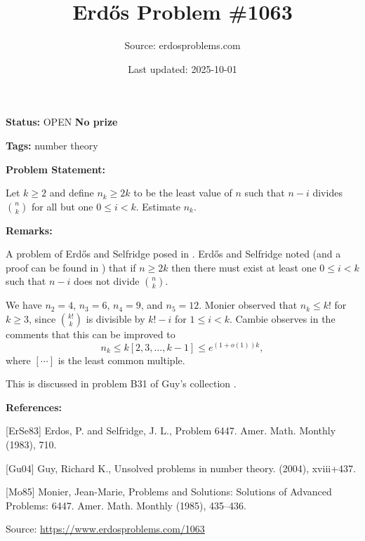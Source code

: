 \documentclass{article}
\title{Erd\H{o}s Problem \#1063}
\date{Last updated: 2025-10-01}
\author{Source: erdosproblems.com}
\begin{document}
\maketitle

\noindent\textbf{Status:} OPEN \quad \textbf{No prize}

\noindent\textbf{Tags:} number theory

\medskip
\noindent\textbf{Problem Statement:}

Let $k\geq 2$ and define $n_k\geq 2k$ to be the least value of $n$ such that $n-i$ divides $\binom{n}{k}$ for all but one $0\leq i<k$. Estimate $n_k$.

\bigskip
\noindent\textbf{Remarks:}

A problem of Erd\H{o}s and Selfridge posed in \cite{ErSe83}. Erd\H{o}s and Selfridge noted (and a proof can be found in \cite{Mo85}) that if $n\geq 2k$ then there must exist at least one $0\leq i<k$ such that $n-i$ does not divide $\binom{n}{k}$. 

We have $n_2=4$, $n_3=6$, $n_4=9$, and $n_5=12$. Monier \cite{Mo85} observed that $n_k\leq k!$ for $k\geq 3$, since $\binom{k!}{k}$ is divisible by $k!-i$ for $1\leq i<k$. Cambie observes in the comments that this can be improved to\[n_k\leq k[2,3,\ldots,k-1]\leq e^{(1+o(1))k},\]where $[\cdots]$ is the least common multiple.

This is discussed in problem B31 of Guy's collection \cite{Gu04}.

\bigskip
\noindent\textbf{References:}

[ErSe83] Erdos, P. and Selfridge, J. L., Problem 6447. Amer. Math. Monthly (1983), 710.
 
 [Gu04] Guy, Richard K., Unsolved problems in number theory. (2004), xviii+437.
 
 [Mo85] Monier, Jean-Marie, Problems and Solutions: Solutions of {A}dvanced {P}roblems: 6447. Amer. Math. Monthly (1985), 435--436.

\bigskip
\noindent\small{Source: \url{https://www.erdosproblems.com/1063}}
\end{document}
